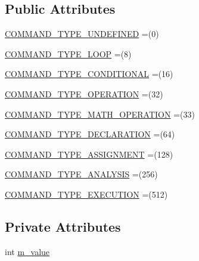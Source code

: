 \subsection*{Public Attributes}
\begin{DoxyCompactItemize}
\item 
\hyperlink{enumorg_1_1jgap_1_1gp_1_1_command_gene_1_1_c_o_m_m_a_n_d___t_y_p_e_ab949014831b08b5cf66481a3c9af8cfd}{C\-O\-M\-M\-A\-N\-D\-\_\-\-T\-Y\-P\-E\-\_\-\-U\-N\-D\-E\-F\-I\-N\-E\-D} =(0)
\item 
\hyperlink{enumorg_1_1jgap_1_1gp_1_1_command_gene_1_1_c_o_m_m_a_n_d___t_y_p_e_aacc937265246317d806203dea32ba6f1}{C\-O\-M\-M\-A\-N\-D\-\_\-\-T\-Y\-P\-E\-\_\-\-L\-O\-O\-P} =(8)
\item 
\hyperlink{enumorg_1_1jgap_1_1gp_1_1_command_gene_1_1_c_o_m_m_a_n_d___t_y_p_e_a064c105951871c2b63dba19d4086f430}{C\-O\-M\-M\-A\-N\-D\-\_\-\-T\-Y\-P\-E\-\_\-\-C\-O\-N\-D\-I\-T\-I\-O\-N\-A\-L} =(16)
\item 
\hyperlink{enumorg_1_1jgap_1_1gp_1_1_command_gene_1_1_c_o_m_m_a_n_d___t_y_p_e_a97a73a6d51ef1a77b27fe182eefada10}{C\-O\-M\-M\-A\-N\-D\-\_\-\-T\-Y\-P\-E\-\_\-\-O\-P\-E\-R\-A\-T\-I\-O\-N} =(32)
\item 
\hyperlink{enumorg_1_1jgap_1_1gp_1_1_command_gene_1_1_c_o_m_m_a_n_d___t_y_p_e_a53ba23defcfab0d7bc3718d90c05a103}{C\-O\-M\-M\-A\-N\-D\-\_\-\-T\-Y\-P\-E\-\_\-\-M\-A\-T\-H\-\_\-\-O\-P\-E\-R\-A\-T\-I\-O\-N} =(33)
\item 
\hyperlink{enumorg_1_1jgap_1_1gp_1_1_command_gene_1_1_c_o_m_m_a_n_d___t_y_p_e_a9c520f6bdbe3c2b4d4462a2e6d4a8ff7}{C\-O\-M\-M\-A\-N\-D\-\_\-\-T\-Y\-P\-E\-\_\-\-D\-E\-C\-L\-A\-R\-A\-T\-I\-O\-N} =(64)
\item 
\hyperlink{enumorg_1_1jgap_1_1gp_1_1_command_gene_1_1_c_o_m_m_a_n_d___t_y_p_e_ae228959730dbee0afabbb081a614e546}{C\-O\-M\-M\-A\-N\-D\-\_\-\-T\-Y\-P\-E\-\_\-\-A\-S\-S\-I\-G\-N\-M\-E\-N\-T} =(128)
\item 
\hyperlink{enumorg_1_1jgap_1_1gp_1_1_command_gene_1_1_c_o_m_m_a_n_d___t_y_p_e_a1ba378ac44245a7db488e9d4ffbd4042}{C\-O\-M\-M\-A\-N\-D\-\_\-\-T\-Y\-P\-E\-\_\-\-A\-N\-A\-L\-Y\-S\-I\-S} =(256)
\item 
\hyperlink{enumorg_1_1jgap_1_1gp_1_1_command_gene_1_1_c_o_m_m_a_n_d___t_y_p_e_abf915f62c27da7b75a821cbed20c8a78}{C\-O\-M\-M\-A\-N\-D\-\_\-\-T\-Y\-P\-E\-\_\-\-E\-X\-E\-C\-U\-T\-I\-O\-N} =(512)
\end{DoxyCompactItemize}
\subsection*{Private Attributes}
\begin{DoxyCompactItemize}
\item 
int \hyperlink{enumorg_1_1jgap_1_1gp_1_1_command_gene_1_1_c_o_m_m_a_n_d___t_y_p_e_ab3894d76aba663f75f77e72c51e347d8}{m\-\_\-value}
\end{DoxyCompactItemize}


